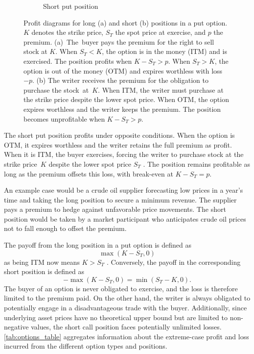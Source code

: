 \documentclass[english,12pt,a4paper,pdftex,sci,utf8]{aaltothesis}
\begin{document}
\begin{figure}[tbp]
\begin{subfigure}[tbp]{0.45\textwidth}
{}
\caption{Short put position}
\end{subfigure}
\caption{Profit diagrams for long (a) and short (b) positions in a put option. $K$ denotes the strike price, $S_T$ the spot price at exercise, and $p$ the premium. \mbox{(a) The buyer} pays the premium for the right to sell stock at $K$. When $S_T < K$, the option is in the money (ITM) and is exercised. The position profits when $K - S_T > p$. When $S_T > K$, the option is out of the money (OTM) and expires worthless with loss $-p$. (b) The writer receives the premium for the obligation to purchase the \mbox{stock at $K$}. When ITM, the writer must purchase at the strike price despite the lower spot price. When OTM, the option expires worthless and the writer keeps the premium. The position becomes unprofitable when $K - S_T > p$.}
\label{fig:put_option_payoffs}
\end{figure}

The short put position profits under opposite conditions. When the option is OTM, it expires worthless and the writer retains the full premium as profit. When it is ITM, the buyer exercises, forcing the writer to purchase stock at the strike price~$K$ despite the lower spot price $S_T$ \cite{hull2018}. The position remains profitable as long as the premium offsets this loss, with break-even at $K - S_T = p$.

An example case would be a crude oil supplier forecasting low prices in a year's time and taking the long position to secure a minimum revenue. The supplier pays a premium to hedge against unfavorable price movements. The short position would be taken by a market participant who anticipates crude oil prices not to fall enough to offset the premium.

The payoff from the long position in a put option is defined as
\begin{equation}
    \max(K-S_T,0)
\label{eq:long_put_payoff}
\end{equation}
as being ITM now means $K > S_T$ \cite{hull2018}. Conversely, the payoff in the corresponding short position is defined as
\begin{equation*}
    -\max(K-S_T,0) = \min(S_T-K,0).
\end{equation*}
The buyer of an option is never obligated to exercise, and the loss is therefore limited to the premium paid. On the other hand, the writer is always obligated to potentially engage in a disadvantageous trade with the buyer. Additionally, since underlying asset prices have no theoretical upper bound but are limited to non-negative values, the short call position faces potentially unlimited losses. \cref{tab:options_table} aggregates information about the extreme-case profit and loss incurred from the different option types and positions.
\end{document}
